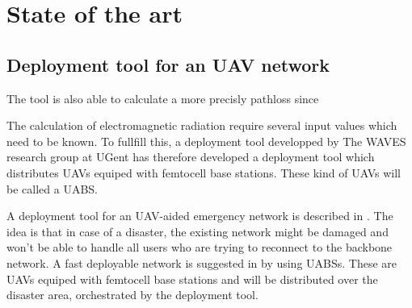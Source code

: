 \chapter{State of the art}
\label{chap:stateoftheart}

\section{Deployment tool for an UAV network}
\label{chap:stateoftheart:deploymenttool}

The tool is also able to calculate a more precisly pathloss since 


The calculation of electromagnetic radiation require several input values which need to be known. To fullfill this, a deployment tool developped by
The WAVES research group at UGent has therefore developed a deployment tool which distributes UAVs equiped with femtocell base stations. These kind of UAVs will be called 
a \gls{UABS}. 

A deployment tool for an UAV-aided emergency network is described in \cite{J2}. The idea is that in case of a disaster, the existing network might be damaged and won't be able 
to handle all users who are trying to reconnect to the backbone network. A fast deployable network is suggested in \cite{J2} by using \gls{UABS}s. These are UAVs equiped with femtocell base stations
and will be distributed over the disaster area, orchestrated by the deployment tool. 


